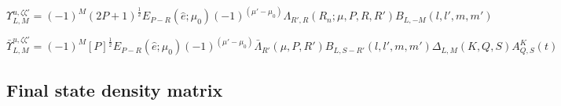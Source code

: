 \documentclass[10pt]{article}
\begin{document}

\begin{equation}
\varUpsilon_{L,M}^{u,\zeta\zeta'}=(-1)^{M}(2P+1)^{\frac{1}{2}}E_{P-R}(\hat{e};\mu_{0})(-1)^{(\mu'-\mu_{0})}\Lambda_{R',R}(R_{\hat{n}};\mu,P,R,R')B_{L,-M}(l,l',m,m')
\label{eq:channel-func-defn-MF}
\end{equation}

\begin{equation}
\bar{\varUpsilon}_{L,M}^{u,\zeta\zeta'}=(-1)^{M}[P]^{\frac{1}{2}}E_{P-R}(\hat{e};\mu_{0})(-1)^{(\mu'-\mu_{0})}\bar{\Lambda}_{R'}(\mu,P,R')B_{L,S-R'}(l,l',m,m')\Delta_{L,M}(K,Q,S)A_{Q,S}^{K}(t)
\label{eq:channel-func-defn-AF}
\end{equation}




\subsection{Final state density matrix\label{sec:density-mat-full}}






\end{document}
